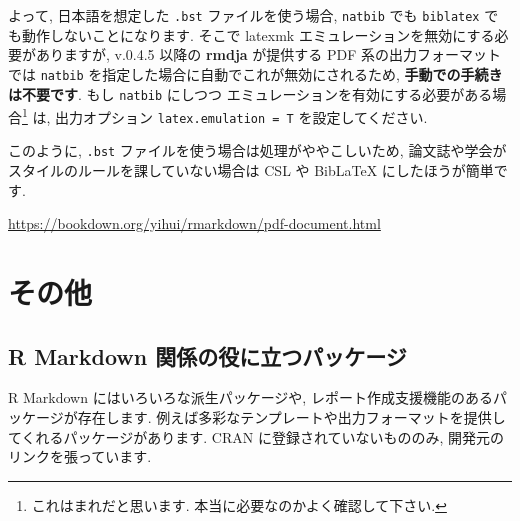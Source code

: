 \documentclass[
]{ltjsarticle}
\begin{document}
よって, 日本語を想定した \texttt{.bst} ファイルを使う場合, \texttt{natbib} でも \texttt{biblatex} でも動作しないことになります. そこで latexmk エミュレーションを無効にする必要がありますが, v.0.4.5 以降の \textbf{rmdja} が提供する PDF 系の出力フォーマットでは \texttt{natbib} を指定した場合に自動でこれが無効にされるため, \textbf{手動での手続きは不要です}. もし \texttt{natbib} にしつつ エミュレーションを有効にする必要がある場合\footnote{これはまれだと思います. 本当に必要なのかよく確認して下さい.} は, 出力オプション \texttt{latex.emulation\ =\ T} を設定してください.

このように, \texttt{.bst} ファイルを使う場合は処理がややこしいため, 論文誌や学会がスタイルのルールを課していない場合は CSL や BibLaTeX にしたほうが簡単です.

\url{https://bookdown.org/yihui/rmarkdown/pdf-document.html}

\hypertarget{ux305dux306eux4ed6}{%
\section{その他}\label{ux305dux306eux4ed6}}

\hypertarget{r-markdown-ux95a2ux4fc2ux306eux5f79ux306bux7acbux3064ux30d1ux30c3ux30b1ux30fcux30b8}{%
\subsection{R Markdown 関係の役に立つパッケージ}\label{r-markdown-ux95a2ux4fc2ux306eux5f79ux306bux7acbux3064ux30d1ux30c3ux30b1ux30fcux30b8}}

R Markdown にはいろいろな派生パッケージや, レポート作成支援機能のあるパッケージが存在します. 例えば多彩なテンプレートや出力フォーマットを提供してくれるパッケージがあります. CRAN に登録されていないもののみ, 開発元のリンクを張っています.
\end{document}

